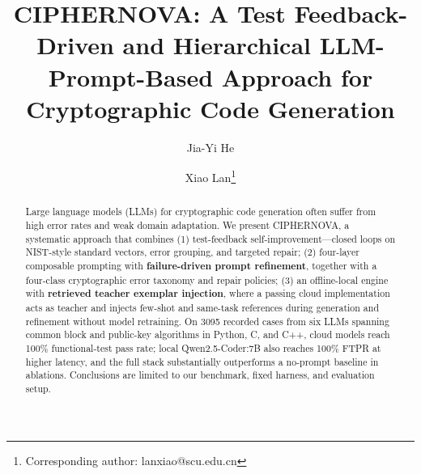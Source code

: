 \documentclass[runningheads]{llncs}
\begin{document}
\title{CIPHERNOVA: A Test Feedback-Driven and Hierarchical LLM-Prompt-Based Approach for Cryptographic Code Generation}

\newif\ifanonymized
\anonymizedfalse   %

\ifanonymized
\author{Anonymous Authors}
\institute{Anonymous Institution\\
\email{anonymous@anonymous.edu}}
\authorrunning{Anonymous Authors}
\else
\author{Jia-Yi He \and Xiao Lan\thanks{Corresponding author: lanxiao@scu.edu.cn}}
\fi
\maketitle
\raggedbottom

\begin{abstract}
Large language models (LLMs) for cryptographic code generation often suffer from high error rates and weak domain adaptation. We present CIPHERNOVA, a systematic approach that combines (1) test-feedback self-improvement---closed loops on NIST-style standard vectors, error grouping, and targeted repair; (2) four-layer composable prompting with \textbf{failure-driven prompt refinement}, together with a four-class cryptographic error taxonomy and repair policies; (3) an offline-local engine with \textbf{retrieved teacher exemplar injection}, where a passing cloud implementation acts as teacher and injects few-shot and same-task references during generation and refinement without model retraining. On 3095 recorded cases from six LLMs spanning common block and public-key algorithms in Python, C, and C++, cloud models reach 100\% functional-test pass rate; local Qwen2.5-Coder:7B also reaches 100\% FTPR at higher latency, and the full stack substantially outperforms a no-prompt baseline in ablations. Conclusions are limited to our benchmark, fixed harness, and evaluation setup.
\end{abstract}

\end{document}

